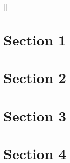 \documentclass{article}
\begin{document}
\ref{}

\section{Section 1}
\label{label1}

\section{Section 2}
\label{label2}

\section{Section 3}
\label{label3}

\section{Section 4}
\label{label4}
\end{document}
